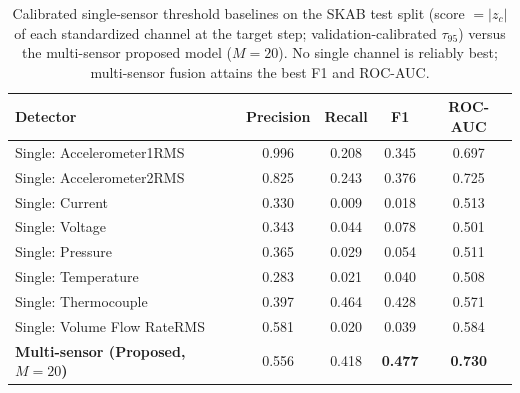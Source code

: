 \begin{table}[H]
\centering
\caption{Calibrated single-sensor threshold baselines on the SKAB test split (score $=|z_c|$ of each standardized channel at the target step; validation-calibrated $\tau_{95}$) versus the multi-sensor proposed model ($M=20$). No single channel is reliably best; multi-sensor fusion attains the best F1 and ROC-AUC.}
\label{table:skab_singlesensor}
\setlength{\tabcolsep}{6pt}\small
\begin{tabular}{lcccc}
\toprule
\textbf{Detector} & \textbf{Precision} & \textbf{Recall} & \textbf{F1} & \textbf{ROC-AUC} \\
\midrule
Single: Accelerometer1RMS & 0.996 & 0.208 & 0.345 & 0.697 \\
Single: Accelerometer2RMS & 0.825 & 0.243 & 0.376 & 0.725 \\
Single: Current           & 0.330 & 0.009 & 0.018 & 0.513 \\
Single: Voltage           & 0.343 & 0.044 & 0.078 & 0.501 \\
Single: Pressure          & 0.365 & 0.029 & 0.054 & 0.511 \\
Single: Temperature       & 0.283 & 0.021 & 0.040 & 0.508 \\
Single: Thermocouple      & 0.397 & 0.464 & 0.428 & 0.571 \\
Single: Volume Flow RateRMS & 0.581 & 0.020 & 0.039 & 0.584 \\
\midrule
\textbf{Multi-sensor (Proposed, $M{=}20$)} & 0.556 & 0.418 & \textbf{0.477} & \textbf{0.730} \\
\bottomrule
\end{tabular}
\end{table}
